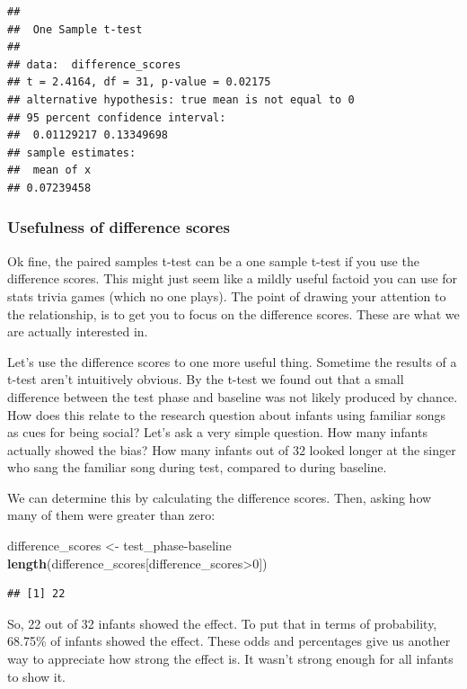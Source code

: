 \documentclass[]{book}
\newenvironment{Shaded}{\begin{snugshade}}{\end{snugshade}}
\newcommand{\KeywordTok}[1]{\textcolor[rgb]{0.13,0.29,0.53}{\textbf{{#1}}}}
\newcommand{\DecValTok}[1]{\textcolor[rgb]{0.00,0.00,0.81}{{#1}}}
\newcommand{\StringTok}[1]{\textcolor[rgb]{0.31,0.60,0.02}{{#1}}}
\newcommand{\NormalTok}[1]{{#1}}
\theoremstyle{definition}
\theoremstyle{definition}
\theoremstyle{definition}
\theoremstyle{remark}
\begin{document}
\begin{verbatim}
## 
##  One Sample t-test
## 
## data:  difference_scores
## t = 2.4164, df = 31, p-value = 0.02175
## alternative hypothesis: true mean is not equal to 0
## 95 percent confidence interval:
##  0.01129217 0.13349698
## sample estimates:
##  mean of x 
## 0.07239458
\end{verbatim}

\subsubsection{Usefulness of difference
scores}\label{usefulness-of-difference-scores}

Ok fine, the paired samples t-test can be a one sample t-test if you use
the difference scores. This might just seem like a mildly useful factoid
you can use for stats trivia games (which no one plays). The point of
drawing your attention to the relationship, is to get you to focus on
the difference scores. These are what we are actually interested in.

Let's use the difference scores to one more useful thing. Sometime the
results of a t-test aren't intuitively obvious. By the t-test we found
out that a small difference between the test phase and baseline was not
likely produced by chance. How does this relate to the research question
about infants using familiar songs as cues for being social? Let's ask a
very simple question. How many infants actually showed the bias? How
many infants out of 32 looked longer at the singer who sang the familiar
song during test, compared to during baseline.

We can determine this by calculating the difference scores. Then, asking
how many of them were greater than zero:

\begin{Shaded}
\begin{Highlighting}[]
\NormalTok{difference_scores <-}\StringTok{ }\NormalTok{test_phase-baseline}
\KeywordTok{length}\NormalTok{(difference_scores[difference_scores>}\DecValTok{0}\NormalTok{])}
\end{Highlighting}
\end{Shaded}

\begin{verbatim}
## [1] 22
\end{verbatim}

So, 22 out of 32 infants showed the effect. To put that in terms of
probability, 68.75\% of infants showed the effect. These odds and
percentages give us another way to appreciate how strong the effect is.
It wasn't strong enough for all infants to show it.
\end{document}
